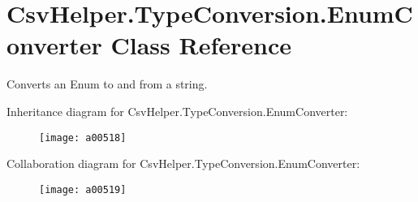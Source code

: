 \hypertarget{a00088}{\section{Csv\-Helper.\-Type\-Conversion.\-Enum\-Converter Class Reference}
\label{a00088}
}


Converts an Enum to and from a string.  




Inheritance diagram for Csv\-Helper.\-Type\-Conversion.\-Enum\-Converter\-:
\nopagebreak
\begin{figure}[H]
\begin{center}
\leavevmode
\texttt{[image: a00518]}
\end{center}
\end{figure}


Collaboration diagram for Csv\-Helper.\-Type\-Conversion.\-Enum\-Converter\-:
\nopagebreak
\begin{figure}[H]
\begin{center}
\leavevmode
\texttt{[image: a00519]}
\end{center}
\end{figure}

